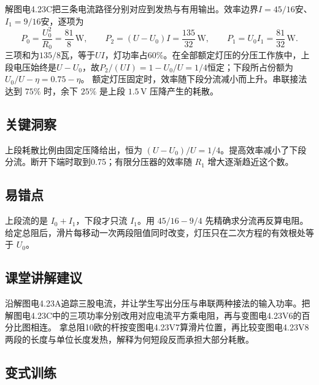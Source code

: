 \documentclass[UTF8,fontset=fandol,a4paper,11pt]{ctexart}
\begin{document}
解图电4.23C把三条电流路径分别对应到发热与有用输出。效率边界$I=45/16$安、$I_1=9/16$安，逐项为
\[
P_0=\frac{U_0^2}{R_0}=\frac{81}{8}\,\mathrm W,\qquad
P_2=(U-U_0)I=\frac{135}{32}\,\mathrm W,\qquad
P_1=U_0I_1=\frac{81}{32}\,\mathrm W.
\]
三项和为$135/8$瓦，等于$UI$，灯功率占60\%。在全部额定灯压的分压工作族中，上段电压始终是$U-U_0$，故$P_2/(UI)=1-U_0/U=1/4$恒定；下段所占份额为$U_0/U-\eta=0.75-\eta$。
额定灯压固定时，效率随下段分流减小而上升。串联接法达到 $75\%$ 时，余下 $25\%$ 是上段 $1.5\,\mathrm V$ 压降产生的耗散。




\subsection*{关键洞察}

上段耗散比例由固定压降给出，恒为 $(U-U_0)/U=1/4$。提高效率减小了下段分流。断开下端时取到0.75；有限分压器的效率随 $R_1$ 增大逐渐趋近这个数。



\subsection*{易错点}

上段流的是 $I_0+I_1$，下段才只流 $I_1$。用 $45/16-9/4$ 先精确求分流再反算电阻。给定总阻后，滑片每移动一次两段阻值同时改变，灯压只在二次方程的有效根处等于 $U_0$。



\subsection*{课堂讲解建议}

沿解图电4.23A追踪三股电流，并让学生写出分压与串联两种接法的输入功率。把解图电4.23C中的三项功率分别改用对应电流平方乘电阻，再与变图电4.23V6的百分比图相连。
拿总阻10欧的杆按变图电4.23V7算滑片位置，再比较变图电4.23V8两段的长度与单位长度发热，解释为何短段反而承担大部分耗散。


\subsection*{变式训练}
\end{document}
